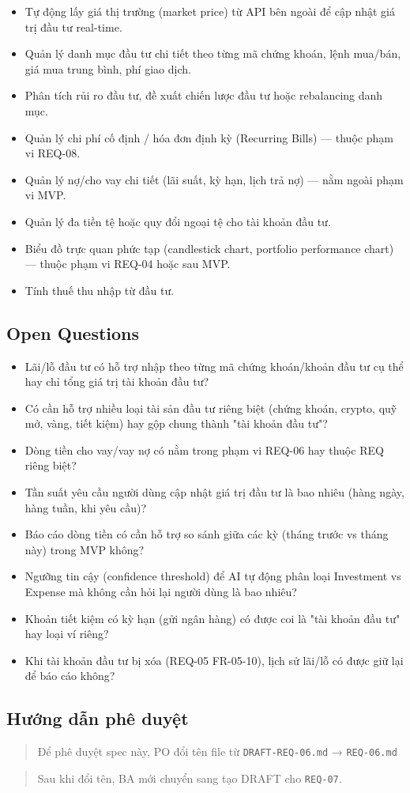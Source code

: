 \begin{itemize}
\item Tự động lấy giá thị trường (market price) từ API bên ngoài để cập nhật giá trị đầu tư real-time.
\item Quản lý danh mục đầu tư chi tiết theo từng mã chứng khoán, lệnh mua/bán, giá mua trung bình, phí giao dịch.
\item Phân tích rủi ro đầu tư, đề xuất chiến lược đầu tư hoặc rebalancing danh mục.
\item Quản lý chi phí cố định / hóa đơn định kỳ (Recurring Bills) — thuộc phạm vi REQ-08.
\item Quản lý nợ/cho vay chi tiết (lãi suất, kỳ hạn, lịch trả nợ) — nằm ngoài phạm vi MVP.
\item Quản lý đa tiền tệ hoặc quy đổi ngoại tệ cho tài khoản đầu tư.
\item Biểu đồ trực quan phức tạp (candlestick chart, portfolio performance chart) — thuộc phạm vi REQ-04 hoặc sau MVP.
\item Tính thuế thu nhập từ đầu tư.
\end{itemize}
\subsection{Open Questions}

\begin{itemize}
\item [ ] Lãi/lỗ đầu tư có hỗ trợ nhập theo từng mã chứng khoán/khoản đầu tư cụ thể hay chỉ tổng giá trị tài khoản đầu tư?
\item [ ] Có cần hỗ trợ nhiều loại tài sản đầu tư riêng biệt (chứng khoán, crypto, quỹ mở, vàng, tiết kiệm) hay gộp chung thành "tài khoản đầu tư"?
\item [ ] Dòng tiền cho vay/vay nợ có nằm trong phạm vi REQ-06 hay thuộc REQ riêng biệt?
\item [ ] Tần suất yêu cầu người dùng cập nhật giá trị đầu tư là bao nhiêu (hàng ngày, hàng tuần, khi yêu cầu)?
\item [ ] Báo cáo dòng tiền có cần hỗ trợ so sánh giữa các kỳ (tháng trước vs tháng này) trong MVP không?
\item [ ] Ngưỡng tin cậy (confidence threshold) để AI tự động phân loại Investment vs Expense mà không cần hỏi lại người dùng là bao nhiêu?
\item [ ] Khoản tiết kiệm có kỳ hạn (gửi ngân hàng) có được coi là "tài khoản đầu tư" hay loại ví riêng?
\item [ ] Khi tài khoản đầu tư bị xóa (REQ-05 FR-05-10), lịch sử lãi/lỗ có được giữ lại để báo cáo không?
\end{itemize}
\subsection{Hướng dẫn phê duyệt}

\begin{quote}
Để phê duyệt spec này, PO đổi tên file từ \texttt{DRAFT-REQ-06.md} → \texttt{REQ-06.md}
\end{quote}

\begin{quote}
Sau khi đổi tên, BA mới chuyển sang tạo DRAFT cho \texttt{REQ-07}.
\end{quote}
